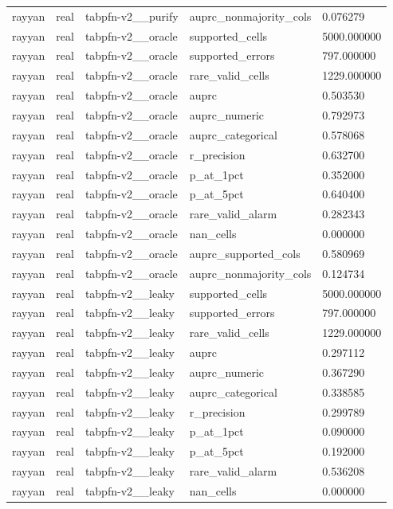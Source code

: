 \begin{tabular}{lllll}
rayyan & real & tabpfn-v2\_\_purify & auprc\_nonmajority\_cols & 0.076279 \\
rayyan & real & tabpfn-v2\_\_oracle & supported\_cells & 5000.000000 \\
rayyan & real & tabpfn-v2\_\_oracle & supported\_errors & 797.000000 \\
rayyan & real & tabpfn-v2\_\_oracle & rare\_valid\_cells & 1229.000000 \\
rayyan & real & tabpfn-v2\_\_oracle & auprc & 0.503530 \\
rayyan & real & tabpfn-v2\_\_oracle & auprc\_numeric & 0.792973 \\
rayyan & real & tabpfn-v2\_\_oracle & auprc\_categorical & 0.578068 \\
rayyan & real & tabpfn-v2\_\_oracle & r\_precision & 0.632700 \\
rayyan & real & tabpfn-v2\_\_oracle & p\_at\_1pct & 0.352000 \\
rayyan & real & tabpfn-v2\_\_oracle & p\_at\_5pct & 0.640400 \\
rayyan & real & tabpfn-v2\_\_oracle & rare\_valid\_alarm & 0.282343 \\
rayyan & real & tabpfn-v2\_\_oracle & nan\_cells & 0.000000 \\
rayyan & real & tabpfn-v2\_\_oracle & auprc\_supported\_cols & 0.580969 \\
rayyan & real & tabpfn-v2\_\_oracle & auprc\_nonmajority\_cols & 0.124734 \\
rayyan & real & tabpfn-v2\_\_leaky & supported\_cells & 5000.000000 \\
rayyan & real & tabpfn-v2\_\_leaky & supported\_errors & 797.000000 \\
rayyan & real & tabpfn-v2\_\_leaky & rare\_valid\_cells & 1229.000000 \\
rayyan & real & tabpfn-v2\_\_leaky & auprc & 0.297112 \\
rayyan & real & tabpfn-v2\_\_leaky & auprc\_numeric & 0.367290 \\
rayyan & real & tabpfn-v2\_\_leaky & auprc\_categorical & 0.338585 \\
rayyan & real & tabpfn-v2\_\_leaky & r\_precision & 0.299789 \\
rayyan & real & tabpfn-v2\_\_leaky & p\_at\_1pct & 0.090000 \\
rayyan & real & tabpfn-v2\_\_leaky & p\_at\_5pct & 0.192000 \\
rayyan & real & tabpfn-v2\_\_leaky & rare\_valid\_alarm & 0.536208 \\
rayyan & real & tabpfn-v2\_\_leaky & nan\_cells & 0.000000 \\

\end{tabular}
